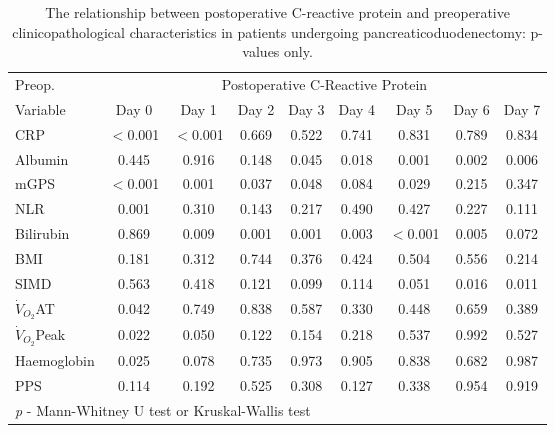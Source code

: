\begin{sidewaystable}[p]
	\caption{The relationship  between postoperative C-reactive protein and preoperative clinicopathological characteristics in patients undergoing pancreaticoduodenectomy: p-values only. }
	\label{table:sirs_crp_pvalues}
	\centering
	\renewcommand{\arraystretch}{1.2} %

	\begin{tabular}{|l | c c c c c c c c|}
		\hline
		Preop.              &         \multicolumn{8}{c|}{Postoperative C-Reactive Protein}          \\
		Variable            & Day 0    & Day 1    & Day 2 & Day 3 & Day 4 & Day 5    & Day 6 & Day 7 \\ \hline
		CRP                 & $<$0.001 & $<$0.001 & 0.669 & 0.522 & 0.741 & 0.831    & 0.789 & 0.834 \\
		Albumin             & 0.445    & 0.916    & 0.148 & 0.045 & 0.018 & 0.001    & 0.002 & 0.006 \\
		mGPS                & $<$0.001 & 0.001    & 0.037 & 0.048 & 0.084 & 0.029    & 0.215 & 0.347 \\
		NLR                 & 0.001    & 0.310    & 0.143 & 0.217 & 0.490 & 0.427    & 0.227 & 0.111 \\
		Bilirubin           & 0.869    & 0.009    & 0.001 & 0.001 & 0.003 & $<$0.001 & 0.005 & 0.072 \\
		BMI                 & 0.181    & 0.312    & 0.744 & 0.376 & 0.424 & 0.504    & 0.556 & 0.214 \\
		SIMD                & 0.563    & 0.418    & 0.121 & 0.099 & 0.114 & 0.051    & 0.016 & 0.011 \\
		$\dot{V}_{O_2}$AT   & 0.042    & 0.749    & 0.838 & 0.587 & 0.330 & 0.448    & 0.659 & 0.389 \\
		$\dot{V}_{O_2}$Peak & 0.022    & 0.050    & 0.122 & 0.154 & 0.218 & 0.537    & 0.992 & 0.527 \\
		Haemoglobin         & 0.025    & 0.078    & 0.735 & 0.973 & 0.905 & 0.838    & 0.682 & 0.987 \\
		PPS                 & 0.114    & 0.192    & 0.525 & 0.308 & 0.127 & 0.338    & 0.954 & 0.919 \\ \hline
		\multicolumn{9}{l}{\textit{p} - Mann-Whitney U test or Kruskal-Wallis test}
	\end{tabular}	
\end{sidewaystable}